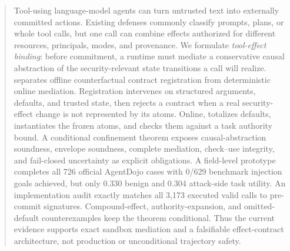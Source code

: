 \begin{abstract}
Tool-using language-model agents can turn untrusted text into externally committed actions. Existing defenses commonly classify prompts, plans, or whole tool calls, but one call can combine effects authorized for different resources, principals, modes, and provenance. We formulate \emph{tool-effect binding}: before commitment, a runtime must mediate a conservative causal abstraction of the security-relevant state transitions a call will realize. \sys{} separates offline counterfactual contract registration from deterministic online mediation. Registration intervenes on structured arguments, defaults, and trusted state, then rejects a contract when a real security-effect change is not represented by its atoms. Online, \sys{} totalizes defaults, instantiates the frozen atoms, and checks them against a task authority bound. A conditional confinement theorem exposes causal-abstraction soundness, envelope soundness, complete mediation, check--use integrity, and fail-closed uncertainty as explicit obligations. A field-level prototype completes all 726 official AgentDojo cases with 0/629 benchmark injection goals achieved, but only 0.330 benign and 0.304 attack-side task utility. An implementation audit exactly matches all 3,173 executed valid calls to pre-commit signatures. Compound-effect, authority-expansion, and omitted-default counterexamples keep the theorem conditional. Thus the current evidence supports exact sandbox mediation and a falsifiable effect-contract architecture, not production or unconditional trajectory safety.
\end{abstract}
